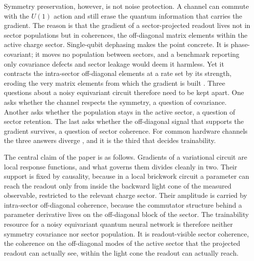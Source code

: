 \documentclass{article}
\begin{document}
Symmetry preservation, however, is not noise protection. A channel can commute with the $U(1)$ action and still erase the quantum information that carries the gradient. The reason is that the gradient of a sector-projected readout lives not in sector populations but in coherences, the off-diagonal matrix elements within the active charge sector. Single-qubit dephasing makes the point concrete. It is phase-covariant; it moves no population between sectors, and a benchmark reporting only covariance defects and sector leakage would deem it harmless. Yet it contracts the intra-sector off-diagonal elements at a rate set by its strength, eroding the very matrix elements from which the gradient is built \cite{marvian2014ncomm,piani2016,baumgratz2014}. Three questions about a noisy equivariant circuit therefore need to be kept apart. One asks whether the channel respects the symmetry, a question of covariance. Another asks whether the population stays in the active sector, a question of sector retention. The last asks whether the off-diagonal signal that supports the gradient survives, a question of sector coherence. For common hardware channels the three answers diverge \cite{ugail2026access}, and it is the third that decides trainability.

The central claim of the paper is as follows. Gradients of a variational circuit are local response functions, and what governs them divides cleanly in two. Their support is fixed by causality, because in a local brickwork circuit a parameter can reach the readout only from inside the backward light cone of the measured observable, restricted to the relevant charge sector. Their amplitude is carried by intra-sector off-diagonal coherence, because the commutator structure behind a parameter derivative lives on the off-diagonal block of the sector. The trainability resource for a noisy equivariant quantum neural network is therefore neither symmetry covariance nor sector population. It is readout-visible sector coherence, the coherence on the off-diagonal modes of the active sector that the projected readout can actually see, within the light cone the readout can actually reach.
\end{document}
